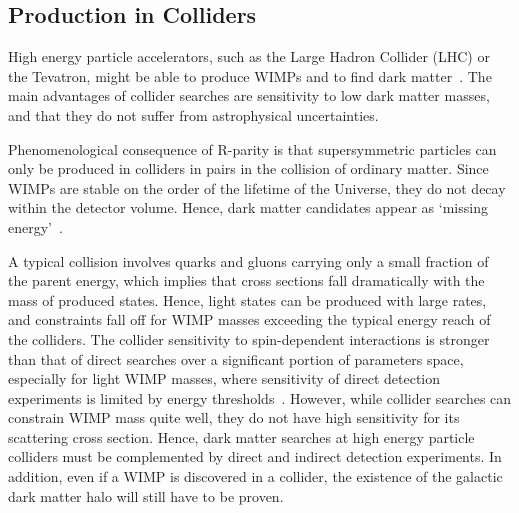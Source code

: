 \subsection{Production in Colliders}
\label{secProductionInColliders}

High energy particle accelerators, such as the Large Hadron Collider (LHC) or the Tevatron, might be able to produce WIMPs and to find dark matter~\cite{Colliders_1, Colliders_3}. The main advantages of collider searches are sensitivity to low dark matter masses, and that they do not suffer from astrophysical uncertainties.

Phenomenological consequence of R-parity is that supersymmetric particles can only be produced in colliders in pairs in the collision of ordinary matter. 
Since WIMPs are stable on the order of the lifetime of the Universe, they do not decay within the detector volume. 
Hence, dark matter candidates appear as `missing energy'~\cite{Colliders_1}. 

A typical collision involves quarks and gluons carrying only a small fraction of the parent energy, which implies that cross sections fall dramatically with the mass of produced states. Hence, light states can be produced with large rates, and constraints fall off for WIMP masses exceeding the typical energy reach of the colliders. The collider sensitivity to spin-dependent interactions is stronger than that of direct searches over a significant portion of parameters space, especially for light WIMP masses, where sensitivity of direct detection experiments is limited by energy thresholds~\cite{Colliders_3}.  However, while collider searches can constrain WIMP mass quite well, they do not have high sensitivity for its scattering cross section. Hence, dark matter searches at high energy particle colliders must be complemented by direct and indirect detection experiments. 
In addition, even if a WIMP is discovered in a collider, the existence of the galactic dark matter halo will still have to be proven.




